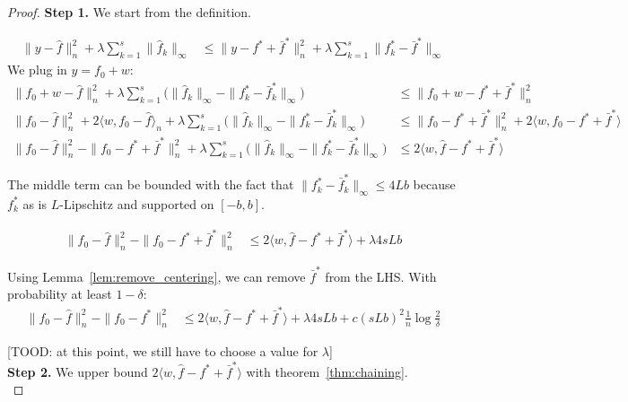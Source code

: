 \begin{proof}

\textbf{Step 1.} We start from the definition. 

\begin{align*}
\| y - \hat{f} \|_n^2 + \lambda \sum_{k=1}^s \| \hat{f}_k \|_\infty &\leq
  \| y - f^* + \bar{f}^* \|_n^2 + \lambda \sum_{k=1}^s \| f^*_k - \bar{f}^* \|_\infty 
\end{align*}
We plug in $y = f_0 + w$:
\begin{align*}
\| f_0 + w - \hat{f} \|_n^2 + \lambda \sum_{k=1}^s \Big( \| \hat{f}_k \|_\infty - 
    \| f^*_k - \bar{f}^*_k \|_\infty \Big) &\leq \|f_0 + w - f^* + \bar{f}^* \|_n^2 \\
\| f_0 - \hat{f} \|_n^2 + 2\langle w, f_0 - \hat{f} \rangle_n 
     +\lambda \sum_{k=1}^s \Big( \| \hat{f}_k \|_\infty - \|f^*_k -\bar{f}^*_k\|_\infty \Big) 
    &\leq \| f_0 - f^* + \bar{f}^* \|_n^2 + 
    2 \langle w, f_0 - f^* + \bar{f}^* \rangle \\
\|f_0 - \hat{f} \|_n^2 - \| f_0 - f^* + \bar{f}^* \|_n^2 + 
    \lambda \sum_{k=1}^s \Big( \| \hat{f}_k \|_\infty - 
 \| f^*_k - \bar{f}^*_k \|_\infty \Big) &\leq 2 \langle w, \hat{f} - f^* + \bar{f}^* \rangle
\end{align*}

The middle term can be bounded with the fact that $\|f^*_k - \bar{f}^*_k \|_\infty \leq 4Lb$ because $f^*_k$ as is $L$-Lipschitz and supported on $[-b, b]$. 

\begin{align*}
\|f_0 - \hat{f} \|_n^2 - \| f_0 - f^* + \bar{f}^* \|_n^2 
   &\leq 2 \langle w, \hat{f} - f^* + \bar{f}^* \rangle + \lambda 4 s L b 
\end{align*}

Using Lemma~\ref{lem:remove_centering}, we can remove $\bar{f}^*$ from the LHS. With probability at least $1 - \delta$:
\begin{align}
\label{eqn:first_step_inequality}
\|f_0 - \hat{f} \|_n^2 - \| f_0 - f^* \|_n^2 
   &\leq 2 \langle w, \hat{f} - f^* + \bar{f}^* \rangle + \lambda 4 s L b + c(sLb)^2 \frac{1}{n} \log \frac{2}{\delta}
\end{align}

[TOOD: at this point, we still have to choose a value for $\lambda$]\\


\textbf{Step 2.} We upper bound $2 \langle w, \hat{f} - f^* + \bar{f}^* \rangle$ with theorem~\ref{thm:chaining}.\\ 


\end{proof}
